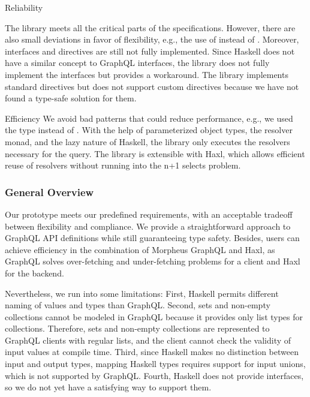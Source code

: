 \begin{frame}[allowframebreaks]
\begin{block}{Reliability}
\begin{itemize}
\begin{enumerate}
    \end{enumerate}

   The library meets all the critical parts of the specifications. However, there are also small deviations in favor of flexibility, e.g., the use of  instead of . Moreover, interfaces and directives are still not fully implemented. Since Haskell does not have a similar concept to GraphQL interfaces, the library does not fully implement the interfaces but provides a workaround. The library implements standard directives but does not support custom directives because we have not found a type-safe solution for them.

\end{itemize}

\end{block}

\begin{block}{Efficiency} We avoid bad patterns that could reduce performance, e.g., we used the type  instead of . 
With the help of parameterized object types, the resolver monad, and the lazy nature of Haskell, the library only executes the resolvers necessary for the query. The library is extensible with Haxl, which allows efficient reuse of resolvers without running into the n+1 selects problem.

\end{block}

\end{frame}

\begin{frame}\frametitle{General Overview}

Our prototype meets our predefined requirements, with an acceptable tradeoff between flexibility and compliance. We provide a straightforward approach to GraphQL API definitions while still guaranteeing type safety. Besides, users can achieve efficiency in the combination of Morpheus GraphQL and Haxl, as GraphQL solves over-fetching and under-fetching problems for a client and  Haxl for the backend.

Nevertheless, we run into some limitations: First, Haskell permits different naming of values and types than GraphQL. Second, sets and non-empty collections cannot be modeled in GraphQL because it provides only list types for collections. Therefore, sets and non-empty collections are represented to GraphQL clients with regular lists, and the client cannot check the validity of input values at compile time. Third, since Haskell makes no distinction between input and output types, mapping Haskell types requires support for input unions, which is not supported by GraphQL. Fourth, Haskell does not provide interfaces, so we do not yet have a satisfying way to support them. 
\end{frame}
